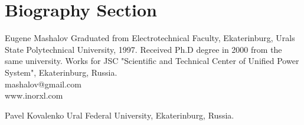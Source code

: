 \documentclass[lettersize,journal]{IEEEtran}
\begin{document}
\section{Biography Section}
\vspace{-33pt}
\begin{IEEEbiography}{Eugene Mashalov}
	Graduated from Electrotechnical Faculty, Ekaterinburg, Urals State Polytechnical University, 1997. 
	Received Ph.D degree in 2000 from the same university. 
	Works for JSC "Scientific and Technical Center of Unified Power System", Ekaterinburg, Russia.\\
	mashalov@gmail.com \\
	www.inorxl.com
\end{IEEEbiography}
\vspace{-30pt}
\begin{IEEEbiography}{Pavel Kovalenko}
	Ural Federal University, Ekaterinburg, Russia.
\end{IEEEbiography}
\vfill
\end{document}
